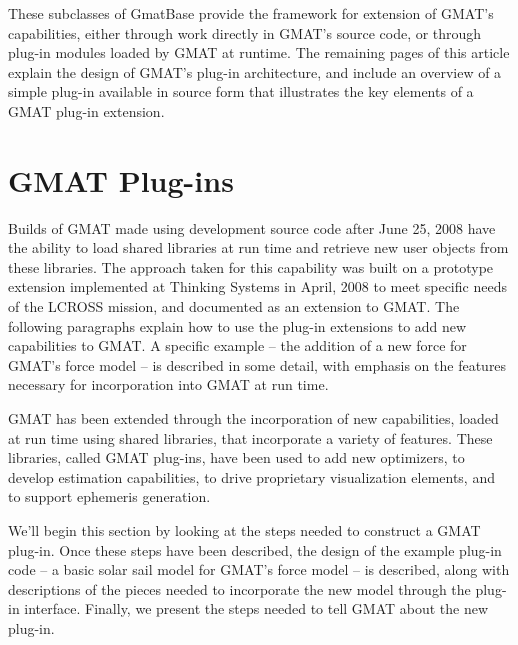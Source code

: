These subclasses of GmatBase provide the framework for extension of GMAT's
capabilities, either through work directly in GMAT's source code, or through
plug-in modules loaded by GMAT at runtime.  The remaining pages of this article
explain the design of GMAT's plug-in architecture, and include an overview of a
simple plug-in available in source form that illustrates the key elements of a
GMAT plug-in extension.

\section{GMAT Plug-ins}

Builds of GMAT made using development source code after June 25,
2008 have the ability to load shared libraries at run time and retrieve new user
objects from these libraries. The approach taken for this capability was built
on a prototype extension implemented at Thinking Systems in April, 2008 to meet
specific needs of the LCROSS mission, and documented as an extension to
GMAT\cite{pluginProp}. The following paragraphs explain how to use the plug-in
extensions to add new capabilities to GMAT.  A specific example -- the addition
of a new force for GMAT's force model -- is described in some detail, with
emphasis on the features necessary for incorporation into GMAT at run time.

GMAT has been extended through the incorporation of new capabilities, loaded at
run time using shared libraries, that incorporate a variety of features.  These
libraries, called GMAT plug-ins, have been used to add new optimizers, to
develop estimation capabilities, to drive proprietary visualization
elements, and to support ephemeris generation.

We'll begin this section by looking at the steps needed to construct a GMAT
plug-in. Once these steps have been described, the design of the example plug-in
code -- a basic solar sail model for GMAT's force model -- is described, along
with descriptions of the pieces needed to incorporate the new model through the
plug-in interface.  Finally, we present the steps needed to tell GMAT about the
new plug-in. 